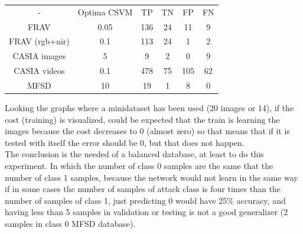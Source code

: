 \begin{table}[htb]
\centering
\label{table-ej1}
\begin{tabular}{cccccc}
-              &Optima CSVM& TP & TN & FP & FN \\
FRAV           &    0.05   & 136& 24 &  11 & 9 \\
FRAV (rgb+nir) &    0.1    & 113& 24 &  1  & 2 \\
CASIA images   &    5      & 9  & 2  &  0  & 9 \\
CASIA videos   &    0.1    & 478& 75 &  105& 62 \\
MFSD           &    10     & 19 &  1 &   8 & 0 \\
\end{tabular}
\end{table}



Looking the graphs where a minidataset has been used (20 images or 14), if the cost (training) is visualized, could be expected that the train is learning the images because the cost decreases to 0 (almost zero) so that means that if it is tested with itself the error should be 0, but that does not happen.\\

The conclusion is the needed of a balanced database, at least to do this experiment. In which the number of class 0 samples are the same that the number of class 1 samples, because the network would not learn in the same way if in some cases the number of samples of  attack class is four times than the number of samples of class 1, just predicting 0 would have 25\% accuracy, and having less than 5 samples in validation or testing is not a good generalizer (2 samples in class 0 MFSD database).\\
